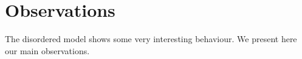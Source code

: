 \documentclass[aps,pre,floats,floatfix,fleqn,notitlepage]{revtex4-1}
\newcommand{\mylabel}[1]{\label{#1}}  %
\newcommand{\be}[1]{\begin{eqnarray}\ifthenelse{#1=-1}{\nonumber}{\ifthenelse{#1=0}{}{\mylabel{e#1}}}}
\newcommand{\ee}{\end{eqnarray}}
\newcommand{\Eq}[1]{\textcolor{blue}{equation~(\ref{#1})}} %
\newcommand{\Fig}[1] {\textcolor{blue}{Fig.~\ref{#1}}} %
\begin{document}


%

\clearpage
\section{Observations}
The disordered model shows some very interesting behaviour. 
We present here our main observations.

\end{document}
